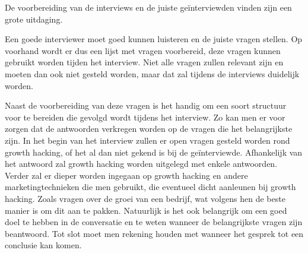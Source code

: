 De voorbereiding van de interviews en de juiste geïnterviewden vinden zijn een grote uitdaging. 

Een goede interviewer moet goed kunnen luisteren en de juiste vragen stellen. Op voorhand wordt er dus een lijst met vragen voorbereid, deze vragen kunnen gebruikt worden tijden het interview. Niet alle vragen zullen relevant zijn en moeten dan ook niet gesteld worden, maar dat zal tijdens de interviews duidelijk worden.

Naast de voorbereiding van deze vragen is het handig om een soort structuur voor te bereiden die gevolgd wordt tijdens het interview. Zo kan men er voor zorgen dat de antwoorden verkregen worden op de vragen die het belangrijkste zijn. In het begin van het interview zullen er open vragen gesteld worden rond growth hacking, of het al dan niet gekend is bij de geïnterviewde. Afhankelijk van het antwoord zal growth hacking worden uitgelegd met enkele antwoorden. Verder zal er dieper worden ingegaan op growth hacking en andere marketingtechnieken die men gebruikt, die eventueel dicht aanleunen bij growth hacking. Zoals vragen over de groei van een bedrijf, wat volgens hen de beste manier is om dit aan te pakken. Natuurlijk is het ook belangrijk om een goed doel te hebben in de conversatie en te weten wanneer de belangrijkste vragen zijn beantwoord. Tot slot moet men rekening houden met wanneer het gesprek tot een conclusie kan komen.


